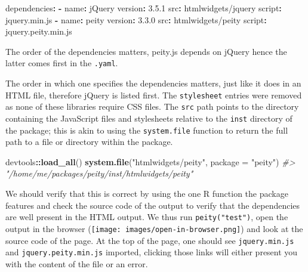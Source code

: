 \documentclass[
  10pt,
]{krantz}
\makeatletter
\newenvironment{Shaded}{\begin{snugshade}}{\end{snugshade}}
\newcommand{\AttributeTok}[1]{\textcolor[rgb]{0.61,0.61,0.61}{#1}}
\newcommand{\CommentTok}[1]{\textcolor[rgb]{0.37,0.37,0.37}{\textit{#1}}}
\newcommand{\DataTypeTok}[1]{\textcolor[rgb]{0.27,0.27,0.27}{#1}}
\newcommand{\FloatTok}[1]{\textcolor[rgb]{0.06,0.06,0.06}{#1}}
\newcommand{\FunctionTok}[1]{\textcolor[rgb]{0,0,0}{#1}}
\newcommand{\KeywordTok}[1]{\textcolor[rgb]{0.27,0.27,0.27}{\textbf{#1}}}
\newcommand{\NormalTok}[1]{#1}
\newcommand{\OperatorTok}[1]{\textcolor[rgb]{0.43,0.43,0.43}{\textbf{#1}}}
\newcommand{\StringTok}[1]{\textcolor[rgb]{0.5,0.5,0.5}{#1}}
\newenvironment{kframe}{%
\medskip{}
\setlength{\fboxsep}{.8em}
 \def\at@end@of@kframe{}%
 \ifinner\ifhmode%
  \def\at@end@of@kframe{\end{minipage}}%
  \begin{minipage}{\columnwidth}%
 \fi\fi%
 \def\FrameCommand##1{\hskip\@totalleftmargin \hskip-\fboxsep
 \colorbox{shadecolor}{##1}\hskip-\fboxsep
     \hskip-\linewidth \hskip-\@totalleftmargin \hskip\columnwidth}%
 \MakeFramed {\advance\hsize-\width
   \@totalleftmargin\z@ \linewidth\hsize
   \@setminipage}}%
 {\par\unskip\endMakeFramed%
 \at@end@of@kframe}
\renewenvironment{Shaded}{\begin{kframe}}{\end{kframe}}
\newenvironment{rmdblock}[1]
  {
  \begin{itemize}
  \renewcommand{\labelitemi}{
    \raisebox{-.7\height}[0pt][0pt]{
      {\setkeys{Gin}{width=3em,keepaspectratio}\texttt{[image: images/\#1]}}
    }
  }
  \setlength{\fboxsep}{1em}
  \begin{kframe}
  \item
  }
  {
  \end{kframe}
  \end{itemize}
  }
\newenvironment{rmdnote}
  {\begin{rmdblock}{note}}
  {\end{rmdblock}}
\makeatother
\begin{document}
\begin{Shaded}
\begin{Highlighting}[]
\FunctionTok{dependencies}\KeywordTok{:}
\AttributeTok{  }\KeywordTok{{-}}\AttributeTok{ }\FunctionTok{name}\KeywordTok{:}\AttributeTok{ jQuery}
\AttributeTok{    }\FunctionTok{version}\KeywordTok{:}\AttributeTok{ }\FloatTok{3.5.1}
\AttributeTok{    }\FunctionTok{src}\KeywordTok{:}\AttributeTok{ htmlwidgets/jquery}
\AttributeTok{    }\FunctionTok{script}\KeywordTok{:}\AttributeTok{ jquery.min.js}
\AttributeTok{  }\KeywordTok{{-}}\AttributeTok{ }\FunctionTok{name}\KeywordTok{:}\AttributeTok{ peity}
\AttributeTok{    }\FunctionTok{version}\KeywordTok{:}\AttributeTok{ }\FloatTok{3.3.0}
\AttributeTok{    }\FunctionTok{src}\KeywordTok{:}\AttributeTok{ htmlwidgets/peity}
\AttributeTok{    }\FunctionTok{script}\KeywordTok{:}\AttributeTok{ jquery.peity.min.js}
\end{Highlighting}
\end{Shaded}

\begin{rmdnote}
The order of the dependencies matters, peity.js depends on jQuery hence
the latter comes first in the \texttt{.yaml}.
\end{rmdnote}

The order in which one specifies the dependencies matters, just like it does in an HTML file, therefore jQuery is listed first. The \texttt{stylesheet} entries were removed as none of these libraries require CSS files. The \texttt{src} path points to the directory containing the JavaScript files and stylesheets relative to the \texttt{inst} directory of the package; this is akin to using the \texttt{system.file} function to return the full path to a file or directory within the package.

\begin{Shaded}
\begin{Highlighting}[]
\NormalTok{devtools}\OperatorTok{::}\KeywordTok{load\_all}\NormalTok{()}
\KeywordTok{system.file}\NormalTok{(}\StringTok{"htmlwidgets/peity"}\NormalTok{, }\DataTypeTok{package =} \StringTok{"peity"}\NormalTok{)                                         }
\CommentTok{\#> "/home/me/packages/peity/inst/htmlwidgets/peity"}
\end{Highlighting}
\end{Shaded}

We should verify that this is correct by using the one R function the package features and check the source code of the output to verify that the dependencies are well present in the HTML output. We thus run \texttt{peity("test")}, open the output in the browser (\texttt{[image: images/open-in-browser.png]}) and look at the source code of the page. At the top of the page, one should see \texttt{jquery.min.js} and \texttt{jquery.peity.min.js} imported, clicking those links will either present you with the content of the file or an error.
\end{document}
